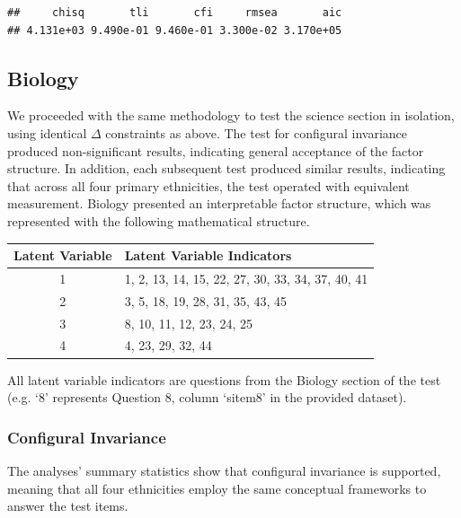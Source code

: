 \documentclass{article}\usepackage[]{graphicx}\usepackage[]{color}
\makeatletter
\newenvironment{kframe}{%
 \def\at@end@of@kframe{}%
 \ifinner\ifhmode%
  \def\at@end@of@kframe{\end{minipage}}%
  \begin{minipage}{\columnwidth}%
 \fi\fi%
 \def\FrameCommand##1{\hskip\@totalleftmargin \hskip-\fboxsep
 \colorbox{shadecolor}{##1}\hskip-\fboxsep
     \hskip-\linewidth \hskip-\@totalleftmargin \hskip\columnwidth}%
 \MakeFramed {\advance\hsize-\width
   \@totalleftmargin\z@ \linewidth\hsize
   \@setminipage}}%
 {\par\unskip\endMakeFramed%
 \at@end@of@kframe}
\newenvironment{knitrout}{}{} %
\makeatother
\begin{document}
\begin{knitrout}
\color{fgcolor}\begin{kframe}
\begin{verbatim}
##     chisq       tli       cfi     rmsea       aic 
## 4.131e+03 9.490e-01 9.460e-01 3.300e-02 3.170e+05
\end{verbatim}
\end{kframe}
\end{knitrout}


\subsection{Biology}
We proceeded with the same methodology to test the science section in isolation, using identical $\Delta$ constraints as above. The test for configural invariance produced non-significant results, indicating general acceptance of the factor structure. In addition, each subsequent test produced similar results, indicating that across all four primary ethnicities, the test operated with equivalent measurement. Biology presented an interpretable factor structure, which was represented with the following mathematical structure.

\vspace{0.25cm}

\begin{minipage}{\linewidth}
\begin{tabular}{|c|l|}
\multicolumn{1}{c}{Latent Variable} & \multicolumn{1}{l}{Latent Variable Indicators}\tabularnewline
\hline 
1 & 1, 2, 13, 14, 15, 22, 27, 30, 33, 34, 37, 40, 41\tabularnewline
\hline 
2 & 3, 5, 18, 19, 28, 31, 35, 43, 45\tabularnewline
\hline 
3 & 8, 10, 11, 12, 23, 24, 25\tabularnewline
\hline 
4 & 4, 23, 29, 32, 44\tabularnewline
\hline 
\end{tabular}

\bigskip

All latent variable indicators are questions from the Biology section of the test (e.g. `8' represents Question 8, column `sitem8' in the provided dataset).

\end{minipage}



\subsubsection*{Configural Invariance}
The analyses' summary statistics show that configural invariance is supported, meaning that all four ethnicities employ the same conceptual frameworks to answer the test items.
\end{document}
